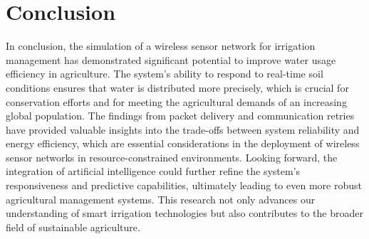 \documentclass[12pt]{article}
\begin{document}
\section{Conclusion}\label{sec:conclusion}
In conclusion, the simulation of a wireless sensor network for irrigation management has demonstrated significant potential to improve water usage efficiency in agriculture. The system's ability to respond to real-time soil conditions ensures that water is distributed more precisely, which is crucial for conservation efforts and for meeting the agricultural demands of an increasing global population. The findings from packet delivery and communication retries have provided valuable insights into the trade-offs between system reliability and energy efficiency, which are essential considerations in the deployment of wireless sensor networks in resource-constrained environments. Looking forward, the integration of artificial intelligence could further refine the system's responsiveness and predictive capabilities, ultimately leading to even more robust agricultural management systems. This research not only advances our understanding of smart irrigation technologies but also contributes to the broader field of sustainable agriculture.
\end{document}
